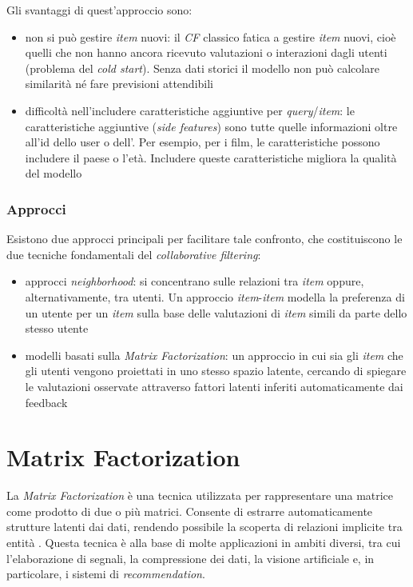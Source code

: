 Gli svantaggi di quest'approccio sono:

\begin{itemize}
  \item non si può gestire \textit{item} nuovi: il \textit{CF} classico fatica a gestire \textit{item} nuovi, cioè quelli che non hanno ancora ricevuto valutazioni o interazioni dagli utenti (problema del \textit{cold start}). Senza dati storici il modello non può calcolare similarità né fare previsioni attendibili
  \item difficoltà nell'includere caratteristiche aggiuntive per \textit{query}/\textit{item}: le caratteristiche aggiuntive (\textit{side features}) sono tutte quelle informazioni oltre all'id dello user o dell'. Per esempio, per i film, le caratteristiche possono includere il paese o l'età. Includere queste caratteristiche migliora la qualità del modello
\end{itemize}

\subsubsection{Approcci}

Esistono due approcci principali per facilitare tale confronto, che costituiscono le due tecniche fondamentali del \textit{collaborative filtering}: 

\begin{itemize}
    \item approcci \textit{neighborhood}: si concentrano sulle relazioni tra \textit{item} oppure, alternativamente, tra utenti. Un approccio \textit{item}-\textit{item} modella la preferenza di un utente per un \textit{item} sulla base delle valutazioni di \textit{item} simili da parte dello stesso utente
    \item modelli basati sulla \textit{Matrix Factorization}: un approccio in cui sia gli \textit{item} che gli utenti vengono proiettati in uno stesso spazio latente, cercando di spiegare le valutazioni osservate attraverso fattori latenti inferiti automaticamente dai feedback
\end{itemize}

\section{Matrix Factorization}\label{matrix_factorization}

La \textit{Matrix Factorization} è una tecnica utilizzata per rappresentare una matrice come prodotto di due o più matrici. Consente di estrarre automaticamente strutture latenti dai dati, rendendo possibile la scoperta di relazioni implicite tra entità \cite{MC}. Questa tecnica è alla base di molte applicazioni in ambiti diversi, tra cui l'elaborazione di segnali, la compressione dei dati, la visione artificiale e, in particolare, i sistemi di \textit{recommendation}.

